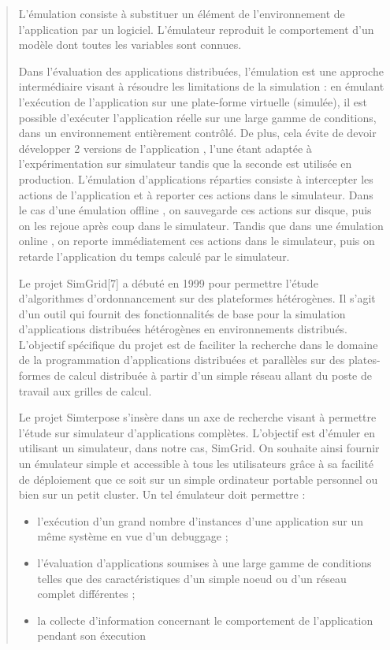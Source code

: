 \documentclass{article}
\begin{document}
\begin{quotation}
L’émulation consiste à substituer un élément de l’environnement de
l’application par un logiciel. L’émulateur reproduit le comportement
d’un modèle dont toutes les variables sont connues.

Dans l’évaluation des applications distribuées, l’émulation est une
approche intermédiaire visant à résoudre les limitations de la
simulation : {\color{red} en émulant l’exécution de l’application sur
  une plate-forme virtuelle (simulée), il est possible d’exécuter
  l’application réelle sur une large gamme de conditions, dans un
  environnement entièrement contrôlé.} De plus, cela évite de devoir
développer 2 versions de l’application , l’une étant adaptée à
l’expérimentation sur simulateur tandis que la seconde est utilisée en
production. L’émulation d’applications réparties consiste à
intercepter les actions de l’application et à reporter ces actions
dans le simulateur.  Dans le cas d’une émulation offline , on
sauvegarde ces actions sur disque, puis on les rejoue après coup dans
le simulateur. Tandis que dans une émulation online , on reporte
immédiatement ces actions dans le simulateur, puis on retarde
l’application du temps calculé par le simulateur.

{\color{green} Le projet SimGrid[7] a débuté en 1999 pour permettre
  l’étude d’algorithmes d’ordonnancement sur des plateformes
  hétérogènes. Il s’agit d’un outil qui fournit des fonctionnalités de
  base pour la simulation d’applications distribuées hétérogènes en
  environnements distribués.  L’objectif spécifique du projet est de
  faciliter la recherche dans le domaine de la programmation
  d’applications distribuées et parallèles sur des plates-formes de
  calcul distribuée à partir d’un simple réseau allant du poste de
  travail aux grilles de calcul.

Le projet Simterpose s’insère dans un axe de recherche visant à
permettre l’étude sur simulateur d’applications complètes. L’objectif
est d’émuler en utilisant un simulateur, dans notre cas, SimGrid. On
souhaite ainsi fournir un émulateur simple et accessible à tous les
utilisateurs grâce à sa facilité de déploiement que ce soit sur un
simple ordinateur portable personnel ou bien sur un petit cluster. Un
tel émulateur doit permettre :
\begin{itemize}
\item l'exécution d’un grand nombre d’instances d’une application sur
  un même système en vue d’un debuggage ;
\item l’évaluation d’applications soumises à une large gamme de
  conditions telles que des caractéristiques d’un simple noeud ou d’un
  réseau complet différentes ;
\item la collecte d’information concernant le comportement de
  l’application pendant son éxecution
\end{itemize}
}
\end{quotation}
\end{document}
